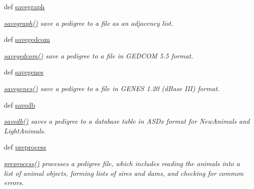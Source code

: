 \begin{DoxyCompactItemize}
def \hyperlink{classPyPedal_1_1pyp__newclasses_1_1NewPedigree_a6babcd0407dd75ff3e5351c96da085aa}{savegraph}
\begin{DoxyCompactList}\small\item\em \hyperlink{classPyPedal_1_1pyp__newclasses_1_1NewPedigree_a6babcd0407dd75ff3e5351c96da085aa}{savegraph()} save a pedigree to a file as an adjacency list. \item\end{DoxyCompactList}\item 
def \hyperlink{classPyPedal_1_1pyp__newclasses_1_1NewPedigree_a4f3ef3055fd807086da58aac2c6499f7}{savegedcom}
\begin{DoxyCompactList}\small\item\em \hyperlink{classPyPedal_1_1pyp__newclasses_1_1NewPedigree_a4f3ef3055fd807086da58aac2c6499f7}{savegedcom()} save a pedigree to a file in GEDCOM 5.5 format. \item\end{DoxyCompactList}\item 
def \hyperlink{classPyPedal_1_1pyp__newclasses_1_1NewPedigree_a41abde8769a72486d5d0e352072338d4}{savegenes}
\begin{DoxyCompactList}\small\item\em \hyperlink{classPyPedal_1_1pyp__newclasses_1_1NewPedigree_a41abde8769a72486d5d0e352072338d4}{savegenes()} save a pedigree to a file in GENES 1.20 (dBase III) format. \item\end{DoxyCompactList}\item 
def \hyperlink{classPyPedal_1_1pyp__newclasses_1_1NewPedigree_abe7890df1b04734981aa7e1e1e4054ec}{savedb}
\begin{DoxyCompactList}\small\item\em \hyperlink{classPyPedal_1_1pyp__newclasses_1_1NewPedigree_abe7890df1b04734981aa7e1e1e4054ec}{savedb()} saves a pedigree to a database table in ASDx format for NewAnimals and LightAnimals. \item\end{DoxyCompactList}\item 
def \hyperlink{classPyPedal_1_1pyp__newclasses_1_1NewPedigree_aa70701de178f69d9c7a3321448681a03}{preprocess}
\begin{DoxyCompactList}\small\item\em \hyperlink{classPyPedal_1_1pyp__newclasses_1_1NewPedigree_aa70701de178f69d9c7a3321448681a03}{preprocess()} processes a pedigree file, which includes reading the animals into a list of animal objects, forming lists of sires and dams, and checking for common errors. \item\end{DoxyCompactList}\item 

\end{DoxyCompactItemize}
